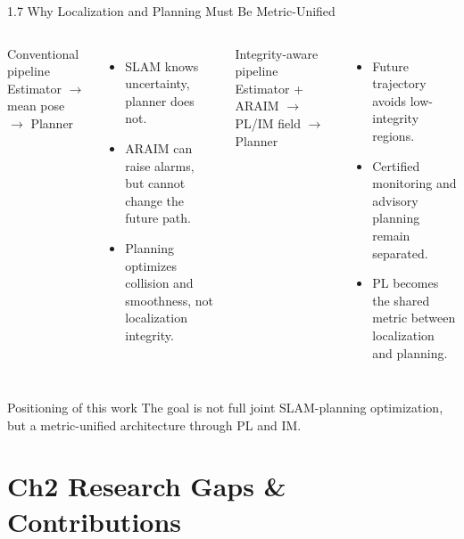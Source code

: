 \documentclass[10pt,aspectratio=169,xcolor=dvipsnames]{beamer}
\newcommand{\tightitem}{\setlength{\itemsep}{2pt}\setlength{\parskip}{0pt}\setlength{\parsep}{0pt}}
\begin{document}
\begin{frame}[t]{1.7 Why Localization and Planning Must Be Metric-Unified}
  \small
  \begin{columns}[T]
    \begin{alertblock}{Conventional pipeline}
      \centering Estimator $\rightarrow$ mean pose $\rightarrow$ Planner
    \end{alertblock}
    \begin{itemize}\tightitem
      \item SLAM knows uncertainty, planner does not.
      \item ARAIM can raise alarms, but cannot change the future path.
      \item Planning optimizes collision and smoothness, not localization integrity.
    \end{itemize}

    \begin{exampleblock}{Integrity-aware pipeline}
      \centering Estimator + ARAIM $\rightarrow$ PL/IM field $\rightarrow$ Planner
    \end{exampleblock}
    \begin{itemize}\tightitem
      \item Future trajectory avoids low-integrity regions.
      \item Certified monitoring and advisory planning remain separated.
      \item PL becomes the shared metric between localization and planning.
    \end{itemize}
  \end{columns}
  \vspace{1mm}
  \begin{block}{Positioning of this work}
    The goal is not full joint SLAM-planning optimization, but a metric-unified architecture through PL and IM.
  \end{block}
\end{frame}

\section{Ch2 Research Gaps \& Contributions}
\end{document}
